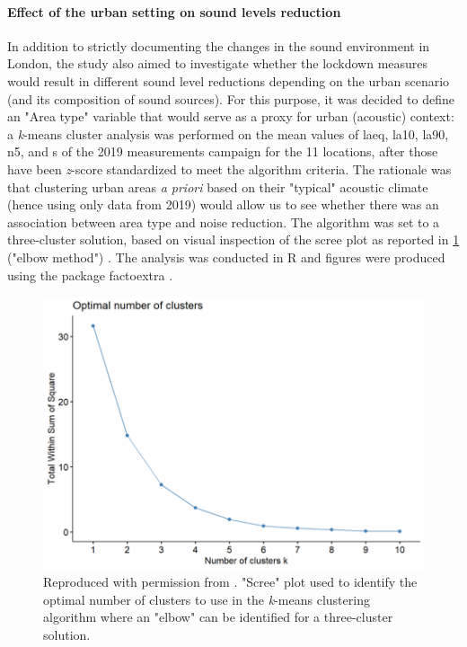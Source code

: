 \paragraph*{Effect of the urban setting on sound levels reduction}
In addition to strictly documenting the changes in the sound environment in London, the study also aimed to investigate whether the lockdown measures would result in different sound level reductions depending on the urban scenario (and its composition of sound sources). For this purpose, it was decided to define an "Area type" variable that would serve as a proxy for urban (acoustic) context: a \emph{k}-means cluster analysis was performed on the mean values of \gls{laeq}, \gls{la10}, \gls{la90}, \gls{n5}, and \gls{s} of the 2019 measurements campaign for the 11 locations, after those have been \emph{z}-score standardized to meet the algorithm criteria. The rationale was that clustering urban areas \emph{a priori} based on their "typical" acoustic climate (hence using only data from 2019) would allow us to see whether there was an association between area type and noise reduction. The algorithm was set to a three-cluster solution, based on visual inspection of the scree plot as reported in \cref{fig:NsMapLockScree} ("elbow method") . The analysis was conducted in R  and figures were produced using the package factoextra . 

\begin{figure}
  \caption{Reproduced with permission from \citet{Aletta2020Assessing}. "Scree" plot used to identify the optimal number of clusters to use in the \emph{k}-means clustering algorithm where an "elbow" can be identified for a three-cluster solution. \label{fig:NsMapLockScree}}
  \centering
  \includegraphics[width=\textwidth]{Figures/NoiseMappingLockdown Fig 6.png}
\end{figure}

